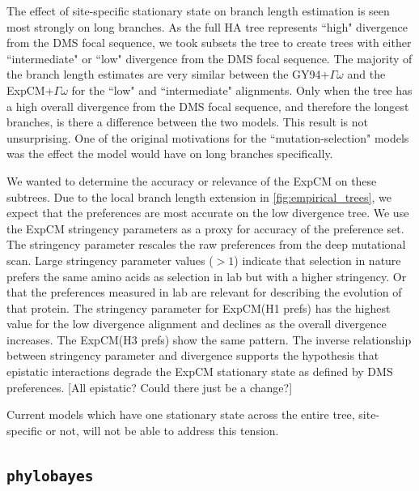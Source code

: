 \documentclass[11pt]{article}
\newcommand\skhcomment[1]{{\color{cyan}[#1]}}
\begin{document}
The effect of site-specific stationary state on branch length estimation is seen most strongly on long branches. 
As the full HA tree represents ``high" divergence from the DMS focal sequence, we took subsets the tree to create trees with either ``intermediate" or ``low" divergence from the DMS focal sequence. 
The majority of the branch length estimates are very similar between the GY94+$\Gamma\omega$ and the ExpCM+$\Gamma\omega$ for the ``low" and ``intermediate" alignments. 
Only when the tree has a high overall divergence from the DMS focal sequence, and therefore the longest branches, is there a difference between the two models. 
This result is not unsurprising. 
One of the original motivations for the ``mutation-selection" models was the effect the model would have on long branches specifically. 

We wanted to determine the accuracy or relevance of the ExpCM on these subtrees. 
Due to the local branch length extension in \ref{fig:empirical_trees}, we expect that the preferences are most accurate on the low divergence tree. We use the ExpCM stringency parameters as a proxy for accuracy of the preference set. 
The stringency parameter rescales the raw preferences from the deep mutational scan. 
Large stringency parameter values ($>1$) indicate that selection in nature prefers the same amino acids as selection in lab but with a higher stringency.
Or that the preferences measured in lab are relevant for describing the evolution of that protein. 
The stringency parameter for ExpCM(H1 prefs) has the highest value for the low divergence alignment and declines as the overall divergence increases. 
The ExpCM(H3 prefs) show the same pattern. 
The inverse relationship between stringency parameter and divergence supports the hypothesis that epistatic interactions degrade the ExpCM stationary state as defined by DMS preferences. 
\skhcomment{All epistatic? Could there just be a change?}

Current models which have one stationary state across the entire tree, site-specific or not, will not be able to address this tension. 

\subsection*{\texttt{phylobayes}}
\end{document}

